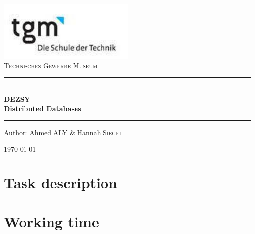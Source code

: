\documentclass[a4paper]{article}
\begin{document}
\begin{titlepage}
\begin{center}
\includegraphics[width=0.5\textwidth]{images/logo}\\[1cm]    

\textsc{\LARGE Technisches Gewerbe Museum}\\[1.5cm]

\rule{12cm}{1mm}
{ \huge \bfseries  \\\large DEZSY\\ \huge Distributed Databases \\[0.4cm] }

\rule{12cm}{1mm}

\noindent 
\vspace{5cm}

\begin{center}
\large
Author: 
Ahmed \textsc{ALY} \&
Hannah \textsc{Siegel}
\end{center}

\vfill

{\large \today}

\end{center}
\end{titlepage}

\tableofcontents

\newpage

\section{Task description}

\section{Working time}
\end{document}
